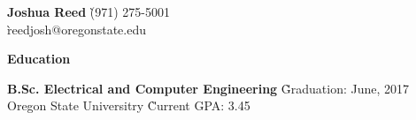 \documentclass[margin, line]{res}
\newcommand{\resheading}[1]{
  \begin{tcolorbox}[width=\textwidth,
                    frame hidden,
                    colback=black!30,
                    enhanced,
                    top=0pt,
                    bottom=0pt,
                    height=16pt
                    ]
      \bf #1
  \end{tcolorbox}
  }
\begin{document}

\begin{tabbing}
  \textbf{\Huge {Joshua Reed} }
            \` {\large (971) 275-5001            }  \\ 
            \` {\large reedjosh@oregonstate.edu  } 
\end{tabbing}

%


\resheading{Education}
\begin{tabbing}
\textbf{ B.Sc. Electrical and Computer Engineering }
            \` Graduation: June, 2017 \\
\hspace{1mm} Oregon State Universitry \` Current GPA: 3.45
\end{tabbing}
\end{document}

